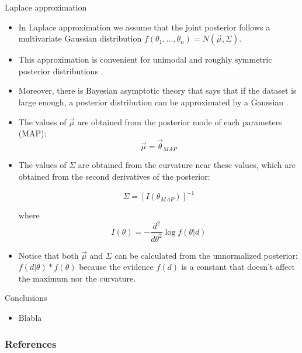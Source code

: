 \documentclass[handout]{beamer}
\begin{document}
\begin{frame}{Laplace approximation}
\scriptsize{

\begin{itemize}
\item In Laplace approximation we assume that the joint posterior follows a multivariate Gaussian distribution $f(\theta_1,\dots,\theta_n) = N(\vec{\mu},\Sigma)$.
\item This approximation is convenient for unimodal and roughly symmetric posterior distributions \cite{gelman2013bayesian}.

\item Moreover, there is Bayesian asymptotic theory that says that if the dataset is large enough, a posterior distribution can be approximated by a Gaussian \cite{gelman2013bayesian}.

\item The values of $\vec{\mu}$ are obtained from the posterior mode of each parameters (MAP):
\begin{displaymath}
 \vec{\mu} = \vec{\theta}_{MAP}
\end{displaymath}



\item The values of $\Sigma$ are obtained from the curvature near these values, which are obtained from the second derivatives of the posterior:

\begin{displaymath}
 \Sigma = [I({\theta}_{MAP})]^{-1}
\end{displaymath}

where  \begin{displaymath}
        I(\theta) = - \frac{d^2}{d\theta^2} \log f(\theta|d)
       \end{displaymath}



\item Notice that both  $\vec{\mu}$ and $\Sigma$ can be calculated from the unnormalized posterior: 
$f(d|\theta)*f(\theta)$ because the evidence $f(d)$ is a constant that doesn't affect the maximum nor the curvature.

\end{itemize}


} 
\end{frame}



\begin{frame}{Conclusions}
\scriptsize{

\begin{itemize}
\item Blabla
\end{itemize}


} 
\end{frame}


\begin{frame}[allowframebreaks]\scriptsize
\frametitle{References}


%
\end{frame}  









\end{document}
